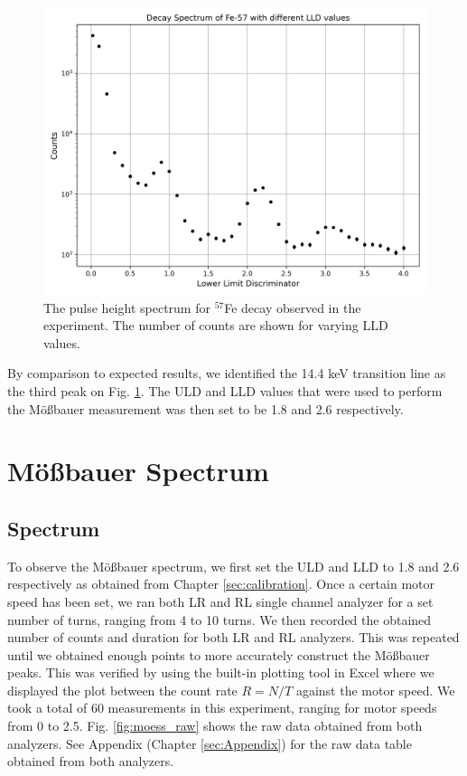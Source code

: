 \documentclass[a4paper]{report}
\numberwithin{equation}{section}
\begin{document}
\begin{figure}[htb!]
	\centering
	\includegraphics[width=0.7\columnwidth]{calib_plot.png}
	\caption{The pulse height spectrum for $^{57}$Fe decay observed in the experiment. The number of counts are shown for varying 
	LLD values.}
	\label{fig:calibration_plot}
\end{figure}

By comparison to expected results, we identified the 14.4 keV transition line as the third peak on Fig. \ref{fig:calibration_plot}. 
The ULD and LLD values that were used to perform the M\"o{\ss}bauer measurement was then set to be 1.8 and 2.6 respectively. \par 



\chapter{M\"o{\ss}bauer Spectrum} \label{sec:moess}

\section{Spectrum}

To observe the M\"o{\ss}bauer spectrum, we first set the ULD and LLD to 1.8 and 2.6 respectively as obtained from Chapter \ref{sec:calibration}. 
Once a certain motor speed has been set, we ran both LR and RL single channel analyzer for a set number of turns, ranging from 4 to 10
turns. We then recorded the obtained number of counts and duration for both LR and RL analyzers. This was repeated until we obtained 
enough points to more accurately construct the M\"o{\ss}bauer peaks. This was verified by using the built-in plotting tool in Excel where we 
displayed the plot between the count rate $R = N / T$ against the motor speed. We took a total of 60 measurements in this experiment, ranging for 
motor speeds from 0 to 2.5. Fig. \ref{fig:moess_raw} shows the raw data obtained from both analyzers. See Appendix (Chapter \ref{sec:Appendix}) for the raw data table obtained from both analyzers. \par 
\end{document}

